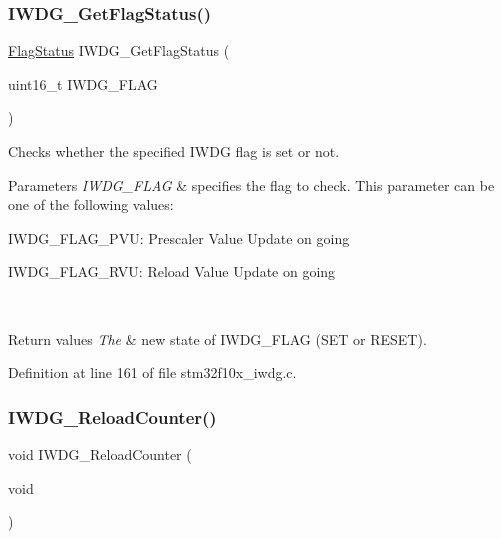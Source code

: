 \subsubsection{\texorpdfstring{I\+W\+D\+G\+\_\+\+Get\+Flag\+Status()}{IWDG\_GetFlagStatus()}}
{\footnotesize\ttfamily \hyperlink{group___exported__types_ga89136caac2e14c55151f527ac02daaff}{Flag\+Status} I\+W\+D\+G\+\_\+\+Get\+Flag\+Status (\begin{DoxyParamCaption}\item[{uint16\+\_\+t}]{I\+W\+D\+G\+\_\+\+F\+L\+AG }\end{DoxyParamCaption})}



Checks whether the specified I\+W\+DG flag is set or not. 


\begin{DoxyParams}{Parameters}
{\em I\+W\+D\+G\+\_\+\+F\+L\+AG} & specifies the flag to check. This parameter can be one of the following values\+: \begin{DoxyItemize}
\item I\+W\+D\+G\+\_\+\+F\+L\+A\+G\+\_\+\+P\+VU\+: Prescaler Value Update on going \item I\+W\+D\+G\+\_\+\+F\+L\+A\+G\+\_\+\+R\+VU\+: Reload Value Update on going \end{DoxyItemize}
\\
\hline
\end{DoxyParams}

\begin{DoxyRetVals}{Return values}
{\em The} & new state of I\+W\+D\+G\+\_\+\+F\+L\+AG (S\+ET or R\+E\+S\+ET). \\
\hline
\end{DoxyRetVals}


Definition at line 161 of file stm32f10x\+\_\+iwdg.\+c.

\mbox{\label{group___i_w_d_g___private___functions_ga7147ebabdc3fef97f532b171a4e70d49}} 
\subsubsection{\texorpdfstring{I\+W\+D\+G\+\_\+\+Reload\+Counter()}{IWDG\_ReloadCounter()}}
{\footnotesize\ttfamily void I\+W\+D\+G\+\_\+\+Reload\+Counter (\begin{DoxyParamCaption}\item[{void}]{ }\end{DoxyParamCaption})}



